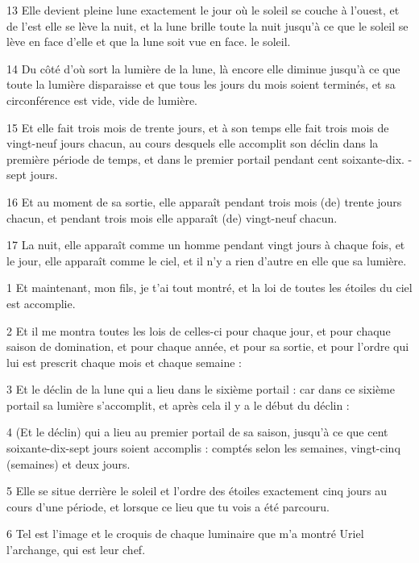 \par 13 Elle devient pleine lune exactement le jour où le soleil se couche à l'ouest, et de l'est elle se lève la nuit, et la lune brille toute la nuit jusqu'à ce que le soleil se lève en face d'elle et que la lune soit vue en face. le soleil.
\par 14 Du côté d'où sort la lumière de la lune, là encore elle diminue jusqu'à ce que toute la lumière disparaisse et que tous les jours du mois soient terminés, et sa circonférence est vide, vide de lumière.
\par 15 Et elle fait trois mois de trente jours, et à son temps elle fait trois mois de vingt-neuf jours chacun, au cours desquels elle accomplit son déclin dans la première période de temps, et dans le premier portail pendant cent soixante-dix. -sept jours.
\par 16 Et au moment de sa sortie, elle apparaît pendant trois mois (de) trente jours chacun, et pendant trois mois elle apparaît (de) vingt-neuf chacun.
\par 17 La nuit, elle apparaît comme un homme pendant vingt jours à chaque fois, et le jour, elle apparaît comme le ciel, et il n'y a rien d'autre en elle que sa lumière.


\par 1 Et maintenant, mon fils, je t'ai tout montré, et la loi de toutes les étoiles du ciel est accomplie.
\par 2 Et il me montra toutes les lois de celles-ci pour chaque jour, et pour chaque saison de domination, et pour chaque année, et pour sa sortie, et pour l'ordre qui lui est prescrit chaque mois et chaque semaine :
\par 3 Et le déclin de la lune qui a lieu dans le sixième portail : car dans ce sixième portail sa lumière s'accomplit, et après cela il y a le début du déclin :
\par 4 (Et le déclin) qui a lieu au premier portail de sa saison, jusqu'à ce que cent soixante-dix-sept jours soient accomplis : comptés selon les semaines, vingt-cinq (semaines) et deux jours.
\par 5 Elle se situe derrière le soleil et l'ordre des étoiles exactement cinq jours au cours d'une période, et lorsque ce lieu que tu vois a été parcouru.
\par 6 Tel est l'image et le croquis de chaque luminaire que m'a montré Uriel l'archange, qui est leur chef.


